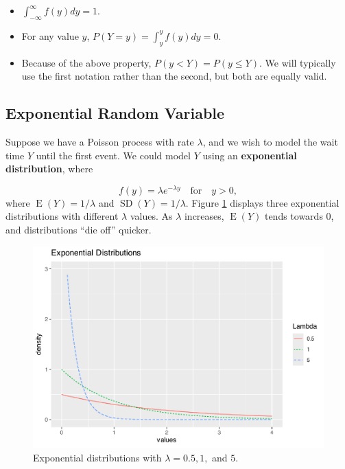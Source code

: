 \documentclass[
]{krantz}
\providecommand{\tightlist}{%
  \setlength{\itemsep}{0pt}\setlength{\parskip}{0pt}}
\newcommand{\E}{\operatorname{E}}
\newcommand{\SD}{\operatorname{SD}}
\begin{document}
\begin{itemize}
\tightlist
\item
  \(\int_{-\infty}^{\infty} f(y)dy = 1\).\\
\item
  For any value \(y\), \(P(Y = y) =  \int_y^y f(y)dy = 0\).\\
\item
  Because of the above property, \(P(y < Y) = P(y \le Y)\). We will typically use the first notation rather than the second, but both are equally valid.
\end{itemize}

\subsection{Exponential Random Variable}\label{exponential-random-variable}

Suppose we have a Poisson process with rate \(\lambda\), and we wish to model the wait time \(Y\) until the first event. We could model \(Y\) using an \textbf{exponential distribution},  where

\begin{equation}
f(y) = \lambda e^{-\lambda y} \quad \textrm{for} \quad y > 0,
\label{eq:expRV}
\end{equation}
where \(\E(Y) = 1/\lambda\) and \(\SD(Y) = 1/\lambda\). Figure \ref{fig:multExp} displays three exponential distributions with different \(\lambda\) values. As \(\lambda\) increases, \(\E(Y)\) tends towards 0, and distributions ``die off'' quicker.



\begin{figure}

{\centering \includegraphics[width=0.6\linewidth]{bookdown-BeyondMLR_files/figure-latex/multExp-1} 

}

\caption{Exponential distributions with \(\lambda = 0.5, 1,\) and \(5\).}\label{fig:multExp}
\end{figure}
\end{document}
